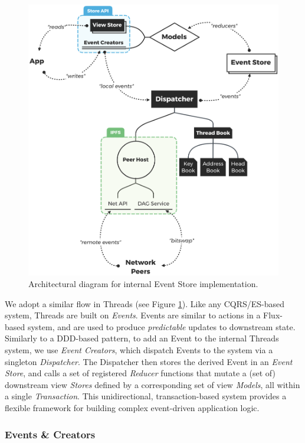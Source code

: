 \documentclass{textile}
\begin{document}
\begin{figure}
  \includegraphics[width=\linewidth]{figures/Architecture.png}
  \caption{Architectural diagram for internal Event Store implementation.}
  \label{fig:Architecture}
\end{figure}

We adopt a similar flow in Threads (see Figure \ref{fig:Architecture}). Like any CQRS/ES-based system, Threads are built on \emph{Events}. Events are similar to actions in a Flux-based system, and are used to produce \emph{predictable} updates to downstream state. Similarly to a DDD-based pattern, to add an Event to the internal Threads system, we use \emph{Event Creators}, which dispatch Events to the system via a singleton \emph{Dispatcher}. The Dispatcher then stores the derived Event in an \emph{Event Store}, and calls a set of registered \emph{Reducer} functions that mutate a (set of) downstream view \emph{Stores} defined by a corresponding set of view \emph{Models}, all within a single \emph{Transaction}. This unidirectional, transaction-based system provides a flexible framework for building complex event-driven application logic.

\subsubsection{Events \& Creators}\label{sec:creators}
\end{document}
